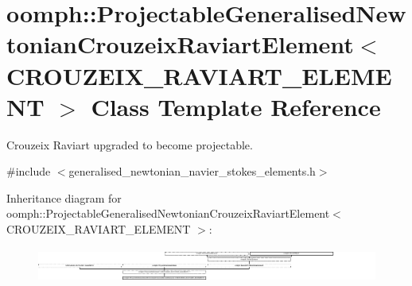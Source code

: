 \hypertarget{classoomph_1_1ProjectableGeneralisedNewtonianCrouzeixRaviartElement}{}\section{oomph\+:\+:Projectable\+Generalised\+Newtonian\+Crouzeix\+Raviart\+Element$<$ C\+R\+O\+U\+Z\+E\+I\+X\+\_\+\+R\+A\+V\+I\+A\+R\+T\+\_\+\+E\+L\+E\+M\+E\+NT $>$ Class Template Reference}
\label{classoomph_1_1ProjectableGeneralisedNewtonianCrouzeixRaviartElement}


Crouzeix Raviart upgraded to become projectable.  




{\ttfamily \#include $<$generalised\+\_\+newtonian\+\_\+navier\+\_\+stokes\+\_\+elements.\+h$>$}

Inheritance diagram for oomph\+:\+:Projectable\+Generalised\+Newtonian\+Crouzeix\+Raviart\+Element$<$ C\+R\+O\+U\+Z\+E\+I\+X\+\_\+\+R\+A\+V\+I\+A\+R\+T\+\_\+\+E\+L\+E\+M\+E\+NT $>$\+:\begin{figure}[H]
\begin{center}
\leavevmode
\includegraphics[height=1.164726cm]{classoomph_1_1ProjectableGeneralisedNewtonianCrouzeixRaviartElement}
\end{center}
\end{figure}
